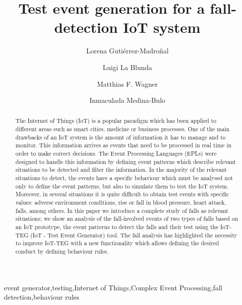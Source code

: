 \documentclass[review]{elsarticle}
\begin{document}
\begin{frontmatter}

\title{Test event generation for a fall-detection IoT system}


\author{Lorena Guti\'errez-Madro\~nal}
\author{Luigi La Blunda}
\author{Matthias F. Wagner}
\author{Inmaculada Medina-Bulo}
\address[label1]{UCASE Software Engineering Research group, University of C\'adiz, Av. Universidad de C\'adiz, 10, 11519 Puerto Real, Spain}
\address[label2]{WSN and IOT Research Group Frankfurt University of Applied Sciences, Nibelungenplatz 1, 60318 Frankfurt am Main, Germany}


\begin{abstract}
The Internet of Things (IoT) is a popular paradigm which has been applied to different areas 
such as smart cities, medicine or business processes. One of the main drawbacks of an IoT system is the 
amount of information it has to manage and to monitor. This information arrives as events that need 
to be processed in real time in order to make correct decisions. The Event Processing Languages (EPLs) were 
designed to handle this information by defining event patterns which describe relevant situations to be 
detected and filter the information. 
In the majority of the relevant situations to detect, the events have a specific behaviour which must be analysed
not only to define the event patterns, but also to simulate them to test the IoT system. Moreover, in several 
situations it is quite difficult to obtain test events with specific values: adverse environment conditions, 
rise or fall in blood pressure, heart attack, falls, among others. 
In this paper we introduce a complete study of falls as relevant situations; we show an analysis of the fall-involved
events of two types of falls based on an IoT prototype, the event patterns to detect the falls and their test using 
the IoT-TEG (IoT - Test Event Generator) tool. The fall analysis has highlighted the necessity to improve IoT-TEG 
with a new functionality which allows defining the desired conduct by defining behaviour rules.
\end{abstract}

\begin{keyword}
event generator\sep testing\sep Internet of Things\sep Complex Event Processing\sep fall detection\sep behaviour rules
\end{keyword}

\end{frontmatter}
\end{document}
